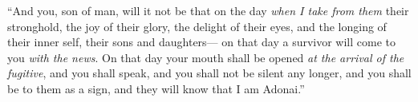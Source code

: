 \begin{biblechapter}
\verse “And you, son of man, will it not be that on the day \textit{when I take from them} their stronghold, the joy of their glory, the delight of their eyes, and the longing of their inner self, their sons and daughters—
\verse on that day a survivor will come to you \textit{with the news}.
\verse On that day your mouth shall be opened \textit{at the arrival of the fugitive}, and you shall speak, and you shall not be silent any longer, and you shall be to them as a sign, and they will know that I am Adonai.”
\end{biblechapter}

